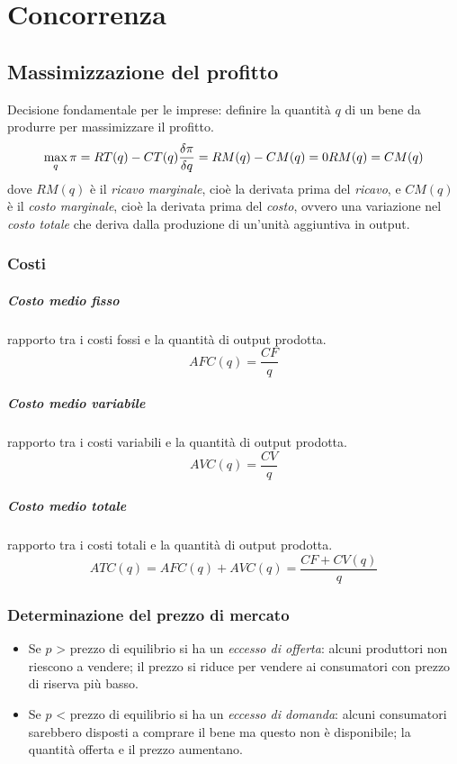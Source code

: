 \chapter{Concorrenza}

\section{Massimizzazione del profitto}
Decisione fondamentale per le imprese: definire la quantità $q$ di un bene da produrre per
massimizzare il profitto.
\[
\max_q \pi = RT(q) - CT(q) \\ \frac{\delta \pi}{\delta q} = RM(q) - CM(q) = 0 \\ RM(q) = CM(q)
\]
dove $RM(q)$ è il \emph{ricavo marginale}, cioè la derivata prima del \emph{ricavo}, e $CM(q)$ è il \emph{costo marginale}, cioè la derivata prima del \emph{costo}, ovvero una variazione nel \emph{costo totale} che deriva dalla
produzione di un'unità aggiuntiva in output.

\subsection{Costi}

\paragraph{Costo medio fisso}
rapporto tra i costi fossi e la quantità di output prodotta.
\[
AFC(q) = \frac{CF}{q}
\]

\paragraph{Costo medio variabile}
rapporto tra i costi variabili e la quantità di output prodotta.
\[
AVC(q) = \frac{CV}{q}
\]

\paragraph{Costo medio totale}
rapporto tra i costi totali e la quantità di output prodotta.
\[
ATC(q) = AFC(q) + AVC(q) = \frac{CF + CV(q)}{q}
\]

\subsection{Determinazione del prezzo di mercato}
\begin{itemize}
	\item Se $p$ > prezzo di equilibrio si ha un \emph{eccesso di offerta}: alcuni produttori non riescono a vendere; il
	prezzo si riduce per vendere ai consumatori con prezzo di riserva più basso.
	\item Se $p$ < prezzo di equilibrio si ha un \emph{eccesso di domanda}: alcuni consumatori sarebbero disposti a comprare il bene ma questo non è
disponibile; la quantità offerta e il prezzo aumentano.
\end{itemize}

